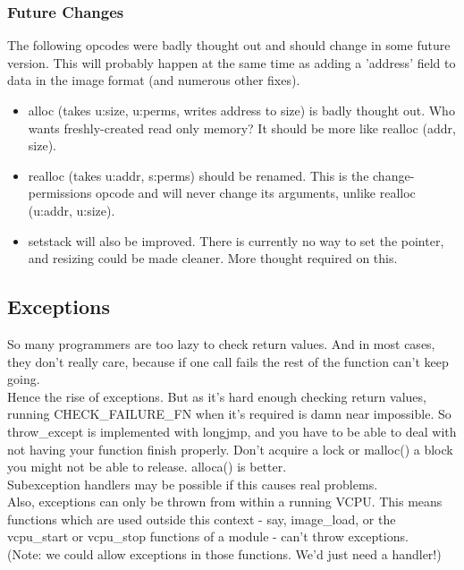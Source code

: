\documentclass[a4paper,oneside,openany]{book}
\begin{document}
\subsubsection{Future Changes}
The following opcodes were badly thought out and should change in some future
version. This will probably happen at the same time as adding a 'address' field
to data in the image format (and numerous other fixes).
\begin{itemize}
\item{}alloc (takes u:size, u:perms, writes address to size) is badly thought out. Who
wants freshly-created read only memory? It should be more like realloc (addr, size).
\item{}realloc (takes u:addr, s:perms) should be renamed. This is the change-permissions
opcode and will never change its arguments, unlike realloc (u:addr, u:size).
\item{}setstack will also be improved. There is currently no way to set the pointer,
and resizing could be made cleaner. More thought required on this.
\end{itemize}
\subsection{Exceptions}
So many programmers are too lazy to check return values. And in most cases, they
don't really care, because if one call fails the rest of the function can't keep
going.\smallskip\\
Hence the rise of exceptions. But as it's hard enough checking return values,
running CHECK\_FAILURE\_FN when it's required is damn near impossible. So
throw\_except is implemented with longjmp, and you have to be able to deal
with not having your function finish properly. Don't acquire a lock or 
malloc() a block you might not be able to release. alloca() is better.\smallskip\\
Subexception handlers may be possible if this causes real problems.\smallskip\\
Also, exceptions can only be thrown from within a running VCPU. This means
functions which are used outside this context - say, image\_load, or the
vcpu\_start or vcpu\_stop functions of a module - can't throw exceptions.\\
(Note: we could allow exceptions in those functions. We'd just need a handler!)
\end{document}
